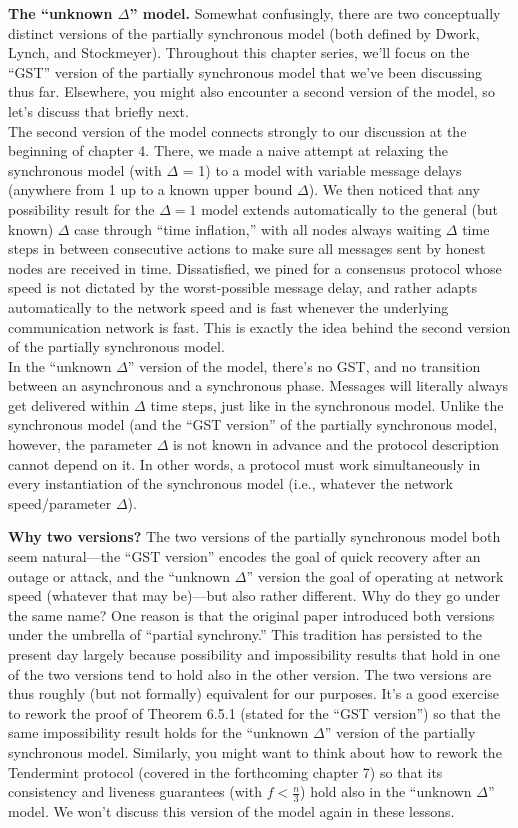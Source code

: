 \noindent
\textbf{The “unknown $\Delta$” model.} Somewhat confusingly, there are two conceptually distinct
versions of the partially synchronous model (both defined by Dwork, Lynch, and Stockmeyer). Throughout this chapter series, we’ll focus on the “GST” version of the partially
synchronous model that we've been discussing thus far. Elsewhere, you might also encounter
a second version of the model, so let’s discuss that briefly next.\\
The second version of the model connects strongly to our discussion at the beginning of
chapter 4. There, we made a naive attempt at relaxing the synchronous model (with $\Delta$ = 1)
to a model with variable message delays (anywhere from 1 up to a known upper bound $\Delta$).
We then noticed that any possibility result for the $\Delta = 1$ model extends automatically to
the general (but known) $\Delta$ case through “time inflation,” with all nodes always waiting $\Delta$
time steps in between consecutive actions to make sure all messages sent by honest nodes are
received in time. Dissatisfied, we pined for a consensus protocol whose speed is not dictated
by the worst-possible message delay, and rather adapts automatically to the network speed
and is fast whenever the underlying communication network is fast. This is exactly the idea
behind the second version of the partially synchronous model.\\
In the “unknown $\Delta$” version of the model, there’s no GST, and no transition between an
asynchronous and a synchronous phase. Messages will literally always get delivered within
$\Delta$ time steps, just like in the synchronous model. Unlike the synchronous model (and the
“GST version” of the partially synchronous model, however, the parameter $\Delta$ is not known
in advance and the protocol description cannot depend on it. In other words, a protocol
must work simultaneously in every instantiation of the synchronous model (i.e., whatever
the network speed/parameter $\Delta$).

\noindent
\textbf{Why two versions?} The two versions of the partially synchronous model both seem
natural—the “GST version” encodes the goal of quick recovery after an outage or attack,
and the “unknown $\Delta$” version the goal of operating at network speed (whatever that may
be)—but also rather different. Why do they go under the same name? One reason is that the
original paper introduced both versions under the umbrella of “partial synchrony.” This
tradition has persisted to the present day largely because possibility and impossibility results
that hold in one of the two versions tend to hold also in the other version. The two versions are thus roughly (but not formally) equivalent
for our purposes. It’s a good exercise to rework the proof of Theorem 6.5.1 (stated for the
“GST version”) so that the same impossibility result holds for the “unknown $\Delta$” version of
the partially synchronous model. Similarly, you might want to think about how to rework
the Tendermint protocol (covered in the forthcoming chapter 7) so that its consistency and
liveness guarantees (with $f < \frac{n}{3}$) hold also in the “unknown $\Delta$” model. We won’t discuss
this version of the model again in these lessons.

